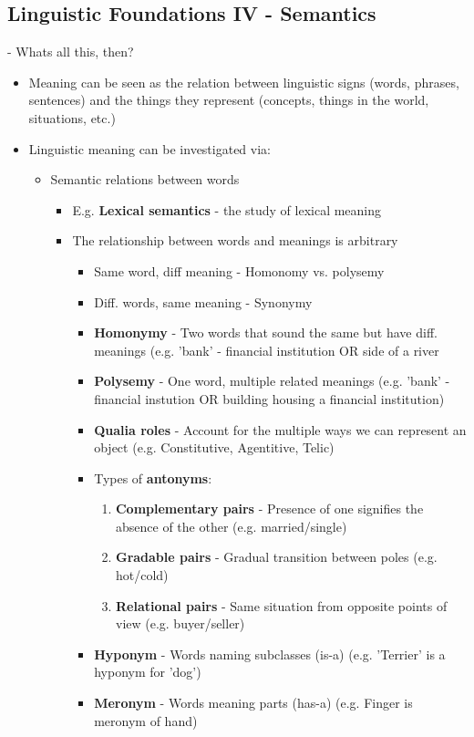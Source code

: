 \documentclass[11pt]{article}
\begin{document}
\subsection{Linguistic Foundations IV - Semantics}
- Whats all this, then?
\begin{itemize}
 \item Meaning can be seen as the relation between linguistic signs (words, phrases, sentences) and the things they represent (concepts, things in the world, situations, etc.)
 \item Linguistic meaning can be investigated via: 
  \begin{itemize}
   \item Semantic relations between words
    \begin{itemize}
     \item E.g. {\bf Lexical semantics} - the study of lexical meaning
     \item The relationship between words and meanings is arbitrary
      \begin{itemize}
       \item Same word, diff meaning - Homonomy vs. polysemy
       \item Diff. words, same meaning - Synonymy
       \item {\bf Homonymy} - Two words that sound the same but have diff. meanings (e.g. 'bank' - financial institution OR side of a river
       \item {\bf Polysemy} - One word, multiple related meanings (e.g. 'bank' - financial instution OR building housing a financial institution) 
       \item {\bf Qualia roles} - Account for the multiple ways we can represent an object (e.g. Constitutive, Agentitive, Telic)
       \item Types of {\bf antonyms}:
	\begin{enumerate}
	 \item {\bf Complementary pairs} - Presence of one signifies the absence of the other (e.g. married/single)
	 \item {\bf Gradable pairs} - Gradual transition between poles (e.g. hot/cold)
	 \item {\bf Relational pairs} - Same situation from opposite points of view (e.g. buyer/seller)
	\end{enumerate}
       \item {\bf Hyponym} - Words naming subclasses (is-a) (e.g. 'Terrier' is a hyponym for 'dog')
       \item {\bf Meronym} - Words meaning parts (has-a) (e.g. Finger is meronym of hand) 

\end{itemize}
\end{itemize}
\end{itemize}
\end{itemize}
\end{document}
